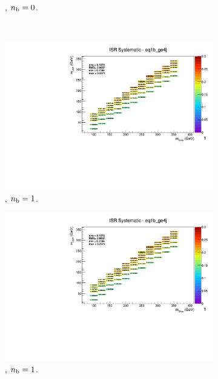 \begin{figure}[ht!]
\begin{subfigure}[b]{0.32\textwidth}
    \caption{\njhigh, $n_{\text{b}} = 0$.}
  \end{subfigure}\\
  \begin{subfigure}[b]{0.32\textwidth}
    \includegraphics[width=\textwidth, page=12]{Figs/sms/t2cc/v37/systs_v2/T2cc_ISR_eq1b_ge4j.pdf}
    \caption{\njhigh, $n_{\text{b}} = 1$.}
  \end{subfigure}
  \begin{subfigure}[b]{0.32\textwidth}
    \includegraphics[width=\textwidth, page=8]{Figs/sms/t2cc/v37/systs_v2/T2cc_ISR_eq1b_ge4j.pdf}
    \caption{\njhigh, $n_{\text{b}} = 1$.}
  \end{subfigure}
  \begin{subfigure}[b]{0.32\textwidth}

\end{subfigure}
\end{figure}
